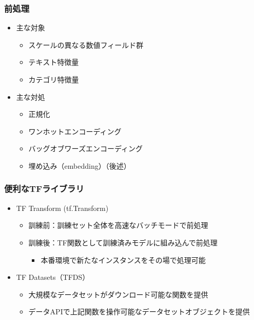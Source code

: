 \hypertarget{ux524dux51e6ux7406}{%
\subsubsection{前処理}\label{ux524dux51e6ux7406}}

\begin{itemize}
\tightlist
\item
  主な対象

  \begin{itemize}
  \tightlist
  \item
    スケールの異なる数値フィールド群
  \item
    テキスト特徴量
  \item
    カテゴリ特徴量
  \end{itemize}
\item
  主な対処

  \begin{itemize}
  \tightlist
  \item
    正規化
  \item
    ワンホットエンコーディング
  \item
    バッグオブワーズエンコーディング
  \item
    埋め込み（embedding）（後述）
  \end{itemize}
\end{itemize}

\hypertarget{ux4fbfux5229ux306atfux30e9ux30a4ux30d6ux30e9ux30ea}{%
\subsubsection{便利なTFライブラリ}\label{ux4fbfux5229ux306atfux30e9ux30a4ux30d6ux30e9ux30ea}}

\begin{itemize}
\tightlist
\item
  TF Transform (tf.Transform)

  \begin{itemize}
  \tightlist
  \item
    訓練前：訓練セット全体を高速なバッチモードで前処理
  \item
    訓練後：TF関数として訓練済みモデルに組み込んで前処理

    \begin{itemize}
    \tightlist
    \item
      本番環境で新たなインスタンスをその場で処理可能
    \end{itemize}
  \end{itemize}
\item
  TF Datasets（TFDS）

  \begin{itemize}
  \tightlist
  \item
    大規模なデータセットがダウンロード可能な関数を提供
  \item
    データAPIで上記関数を操作可能なデータセットオブジェクトを提供
  \end{itemize}
\end{itemize}

